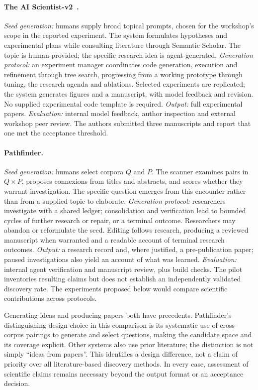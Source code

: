 \documentclass[11pt,a4paper]{article}
\begin{document}
\paragraph{The AI Scientist-v2~\cite{yamada2025scientist}.}
\emph{Seed generation:} humans supply broad topical prompts, chosen for the
workshop's scope in the reported experiment. The system formulates hypotheses
and experimental plans while consulting literature through Semantic Scholar.
The topic is human-provided; the specific research idea is agent-generated.
\emph{Generation protocol:} an experiment manager coordinates code generation,
execution and refinement through tree search, progressing from a working
prototype through tuning, the research agenda and ablations. Selected
experiments are replicated; the system generates figures and a manuscript,
with model feedback and revision. No supplied experimental code template is
required. \emph{Output:} full experimental papers.
\emph{Evaluation:} internal model feedback, author inspection and external
workshop peer review. The authors submitted three manuscripts and report that
one met the acceptance threshold.

\paragraph{Pathfinder.}
\emph{Seed generation:} humans select corpora $Q$ and $P$. The scanner examines
pairs in $Q\times P$, proposes connexions from titles and abstracts, and scores
whether they warrant investigation. The specific question emerges from this
encounter rather than from a supplied topic to elaborate.
\emph{Generation protocol:} researchers investigate with a shared ledger;
consolidation and verification lead to bounded cycles of further research or
repair, or a terminal outcome. Researchers may abandon or reformulate the
seed. Editing follows research, producing a reviewed manuscript when warranted
and a readable account of terminal research outcomes.
\emph{Output:} a research record and, where justified, a pre-publication paper;
paused investigations also yield an account of what was learned.
\emph{Evaluation:} internal agent verification and manuscript review, plus
build checks. The pilot inventories resulting claims but does not establish
an independently validated discovery rate. The experiments proposed below
would compare scientific contributions across protocols.

Generating ideas and producing papers both have precedents. Pathfinder's
distinguishing design choice in this comparison is its systematic use of
cross-corpus pairings to generate and select questions, making the candidate
space and its coverage explicit. Other systems also use prior literature;
the distinction is not simply ``ideas from papers''. This identifies a design
difference, not a claim of priority over all literature-based discovery
methods. In every case, assessment of scientific claims remains necessary
beyond the output format or an acceptance decision.
\end{document}
